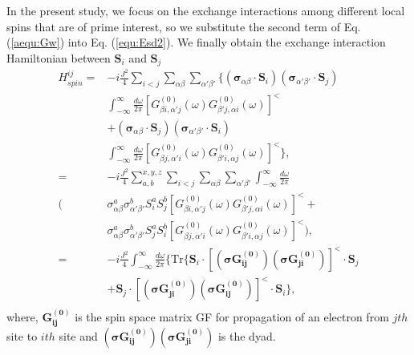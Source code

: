 \documentclass[aps,prb,twocolumn,showpacs,amssymb]{revtex4-1}
\begin{document}
\begin{appendix}
In the present study, we focus on the exchange interactions among different local spins that are of prime interest, so we substitute the second term of Eq. (\ref{aequ:Gw}) into Eq. (\ref{equ:Esd2}). We finally obtain the exchange interaction Hamiltonian between $\bm{S}_i$ and $\bm{S}_j$
\begin{equation}\label{aequ:Esd1}
\begin{aligned}
H_{spin}^{ij}
=&-i\frac{J^2}{4}\sum\limits_{i<j}\sum\limits_{\alpha\beta}\sum\limits_{\alpha'\beta'}\{(\bm{\sigma}_{\alpha\beta}\cdot\bm{S}_{i})(\bm{\sigma}_{\alpha'\beta'}\cdot\bm{S}_{j})\\
&\int^{\infty}_{-\infty}\frac{d\omega}{2\pi}[G_{{\beta}i,{\alpha'}j}^{(0)}(\omega)G_{{\beta'}j,{\alpha}i}^{(0)}(\omega)]^{<}\\
&+(\bm{\sigma}_{\alpha\beta}\cdot\bm{S}_{j})(\bm{\sigma}_{\alpha'\beta'}\cdot\bm{S}_{i})\\
&\int^{\infty}_{-\infty}\frac{d\omega}{2\pi}[G_{{\beta}j,{\alpha'}i}^{(0)}(\omega)G_{{\beta'}i,{\alpha}j}^{(0)}(\omega)]^{<}\},\\
=&-i\frac{J^2}{4}\sum\limits_{a,b}^{x,y,z}\sum\limits_{i<j}\sum\limits_{\alpha\beta}\sum\limits_{\alpha'\beta'}\int^{\infty}_{-\infty}\frac{d\omega}{2\pi}\\
(&\sigma^a_{\alpha\beta}\sigma^b_{\alpha'\beta'}{S}^a_{i}{S}^b_{j}[G_{{\beta}i,{\alpha'}j}^{(0)}(\omega)G_{{\beta'}j,{\alpha}i}^{(0)}(\omega)]^{<}+\\
&\sigma^a_{\alpha\beta}\sigma^b_{\alpha'\beta'}{S}^a_{j}{S}^b_{i}[G_{{\beta}j,{\alpha'}i}^{(0)}(\omega)G_{{\beta'}i,{\alpha}j}^{(0)}(\omega)]^{<}),\\
=&-i\frac{J^2}{4}\int^{\infty}_{-\infty}\frac{d\omega}{2\pi}\{\mathrm{Tr}\{
\bm{S}_{i}\cdot[(\bm{\sigma}\bm{G^{(0)}_{ij}})(\bm{\sigma}\bm{G^{(0)}_{ji}})]^{<}\cdot\bm{S}_{j}\\
&+\bm{S}_{j}\cdot[(\bm{\sigma}\bm{G^{(0)}_{ji}})(\bm{\sigma}\bm{G^{(0)}_{ij}})]^{<}\cdot\bm{S}_{i}\},\\
\end{aligned}
\end{equation}
where, $\bm{G^{(0)}_{ij}}$ is the spin space matrix GF for propagation of an electron from $jth$ site to $ith$ site and $(\bm{\sigma}\bm{G^{(0)}_{ij}})(\bm{\sigma}\bm{G^{(0)}_{ji}})$ is the dyad.


\end{appendix}
\end{document}
